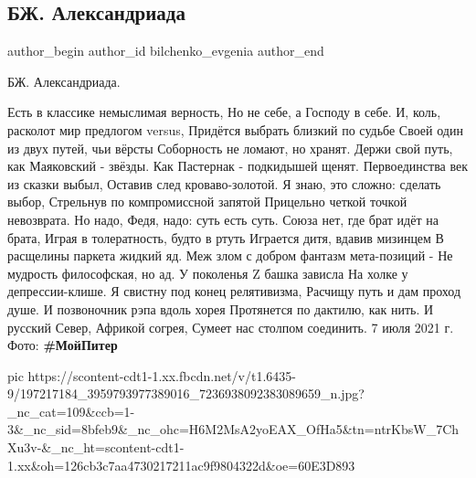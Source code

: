  
 
 
 
 
 
\subsection{БЖ. Александриада}
\label{sec:07_06_2021.fb.bilchenko_evgenia.4.aleksandriada}
\ifcmt
 author_begin
   author_id bilchenko_evgenia
 author_end
\fi

БЖ. Александриада.

Есть в классике немыслимая верность,
Но не себе, а Господу в себе.
И, коль, расколот мир предлогом versus,
Придётся выбрать близкий по судьбе
Своей один из двух путей, чьи вёрсты
Соборность не ломают, но хранят.
Держи свой путь, как Маяковский - звёзды.
Как Пастернак - подкидышей щенят.
Первоединства век из сказки выбыл,
Оставив след кроваво-золотой.
Я знаю, это сложно: сделать выбор,
Стрельнув по компромиссной запятой
Прицельно четкой точкой невозврата.
Но надо, Федя, надо: суть есть суть.
Союза нет, где брат идёт на брата,
Играя в толератность, будто в ртуть
Играется дитя, вдавив мизинцем
В расщелины паркета жидкий яд.
Меж злом с добром фантазм мета-позиций -
Не мудрость философская, но ад.
У поколенья Z башка зависла
На холке у депрессии-клише.
Я свистну под конец релятивизма,
Расчищу путь и дам проход душе.
И позвоночник рэпа вдоль хорея
Протянется по дактилю, как нить.
И русский Север, Африкой согрея,
Сумеет нас столпом соединить.
7 июля 2021 г.
Фото: \textbf{#МойПитер}

\ifcmt
  pic https://scontent-cdt1-1.xx.fbcdn.net/v/t1.6435-9/197217184_3959793977389016_7236938092383089659_n.jpg?_nc_cat=109&ccb=1-3&_nc_sid=8bfeb9&_nc_ohc=H6M2MsA2yoEAX_OfHa5&tn=ntrKbsW_7ChXu3v-&_nc_ht=scontent-cdt1-1.xx&oh=126cb3c7aa4730217211ac9f9804322d&oe=60E3D893
\fi
